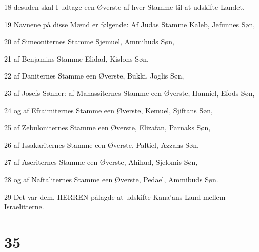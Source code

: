 \par 18 desuden skal I udtage een Øverste af hver Stamme til at udskifte Landet.
\par 19 Navnene på disse Mænd er følgende: Af Judas Stamme Kaleb, Jefunnes Søn,
\par 20 af Simeoniternes Stamme Sjemuel, Ammihuds Søn,
\par 21 af Benjamins Stamme Elidad, Kislons Søn,
\par 22 af Daniternes Stamme een Øverste, Bukki, Joglis Søn,
\par 23 af Josefs Sønner: af Manassiternes Stamme een Øverste, Hanniel, Efods Søn,
\par 24 og af Efraimiternes Stamme een Øverste, Kemuel, Sjiftans Søn,
\par 25 af Zebuloniternes Stamme een Øverste, Elizafan, Parnaks Søn,
\par 26 af Issakariternes Stamme een Øverste, Paltiel, Azzans Søn,
\par 27 af Aseriternes Stamme een Øverste, Ahihud, Sjelomis Søn,
\par 28 og af Naftaliternes Stamme een Øverste, Pedael, Ammibuds Søn.
\par 29 Det var dem, HERREN pålagde at udskifte Kana'ans Land mellem Israelitterne.

\chapter{35}

